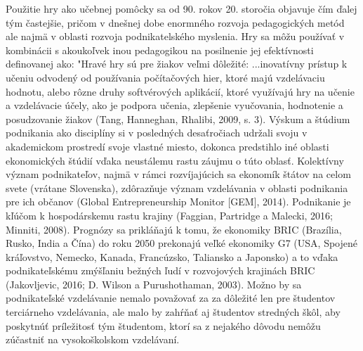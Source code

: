 \documentclass[10pt,oneside,slovak,a4paper]{article}
\begin{document}
Použitie hry ako učebnej pomôcky sa od 90. rokov 20. storočia objavuje čím ďalej tým častejšie, pričom v dnešnej dobe enormného rozvoja pedagogických metód ale najmä v oblasti rozvoja podnikatelského myslenia.
Hry sa môžu používať v kombinácii s akoukoľvek inou pedagogikou na posilnenie jej 
efektívnosti definovanej ako: "Hravé hry sú pre žiakov veľmi dôležité:
...inovatívny prístup k učeniu odvodený od používania počítačových hier, ktoré majú 
vzdelávaciu hodnotu, alebo rôzne druhy softvérových aplikácií, ktoré využívajú hry na učenie a 
vzdelávacie účely, ako je podpora učenia, zlepšenie vyučovania, hodnotenie a posudzovanie žiakov (Tang, Hanneghan, Rhalibi, 2009, s. 3).
Výskum a štúdium podnikania ako disciplíny si v posledných desaťročiach udržali svoju 
v akademickom prostredí svoje vlastné miesto, dokonca predstihlo iné oblasti ekonomických štúdií vďaka neustálemu rastu 
záujmu o túto oblasť. Kolektívny význam podnikateľov, najmä v rámci rozvíjajúcich sa 
ekonomík štátov na celom svete (vrátane Slovenska), zdôrazňuje význam vzdelávania v oblasti podnikania pre ich občanov (Global Entrepreneurship Monitor [GEM], 2014). Podnikanie je kľúčom k hospodárskemu rastu krajiny (Faggian, Partridge a Malecki, 2016; Minniti, 
2008). Prognózy sa prikláňajú k tomu, že ekonomiky BRIC (Brazília, Rusko, India a Čína) do roku 2050 prekonajú veľké ekonomiky G7 (USA, Spojené kráľovstvo, Nemecko, Kanada, Francúzsko, Taliansko a Japonsko) 
a to vďaka podnikateľskému zmýšľaniu bežných ľudí v rozvojových krajinách BRIC (Jakovljevic, 2016; 
D. Wilson a Purushothaman, 2003). Možno by sa podnikateľské vzdelávanie nemalo považovať za 
za dôležité len pre študentov terciárneho vzdelávania, ale malo by zahŕňať aj študentov stredných škôl, aby 
poskytnúť príležitosť tým študentom, ktorí sa z nejakého dôvodu nemôžu zúčastniť na vysokoškolskom vzdelávaní.
\end{document}
